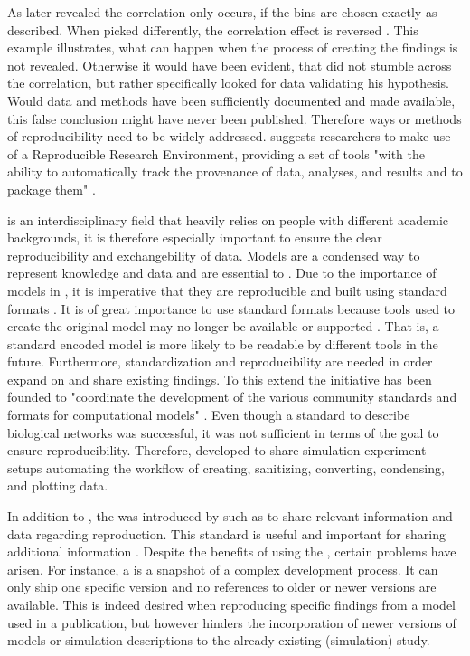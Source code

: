 As later revealed the correlation only occurs, if the bins are chosen exactly as \citeauthor{Phillips1958} described. When picked differently, the correlation effect is reversed \citep{McCullough2008}. This example illustrates, what can happen when the process of creating the findings is not revealed. Otherwise it would have been evident, that \citeauthor{Phillips1958} did not stumble across the correlation, but rather specifically looked for data validating his hypothesis. Would data and methods have been sufficiently documented and made available, this false conclusion might have never been published.
Therefore ways or methods of reproducibility need to be widely addressed. \citeauthor{Mesirov2010} suggests researchers to make use of a Reproducible Research Environment, providing a set of tools "with the ability to automatically track the provenance of data, analyses, and results and to package them" \citep{Mesirov2010}.

\sysbio is an interdisciplinary field that heavily relies on people with different academic backgrounds, it is therefore especially important to ensure the clear reproducibility and exchangebility of data.
Models are a condensed way to represent knowledge and data and are essential to \sysbio.
Due to the importance of models in \sysbio, it is imperative that they are reproducible and built using standard formats \citep{Drager2014}.
It is of great importance to use standard formats because tools used to create the original model may no longer be available or supported \citep{Peng2011}.
That is, a standard encoded model is more likely to be readable by different tools in the future.
Furthermore, standardization and reproducibility are needed in order expand on and share existing findings.
To this extend the \combine initiative has been founded to "coordinate the development of the various community standards and formats for computational models" \citep{COMBINE}.
Even though a standard to describe biological networks was successful, it was not sufficient in terms of the goal to ensure reproducibility. Therefore, \citeauthor{Waltemath2011a} developed \sedml \citep{Waltemath2011a} to share simulation experiment setups automating the workflow of creating, sanitizing, converting, condensing, and plotting data.

In addition to \sedml, the \ca was introduced by \citet{Bergmann2014a} such as to share relevant information and data regarding reproduction. This standard is useful and important for sharing additional information \citep{Bergmann2014a}. %
Despite the benefits of using the \ca, certain problems have arisen. For instance, a \ca is a snapshot of a complex development process. It can only ship one specific version and no references to older or newer versions are available. This is indeed desired when reproducing specific findings from a model used in a publication, but however hinders the incorporation of newer versions of models or simulation descriptions to the already existing (simulation) study.

